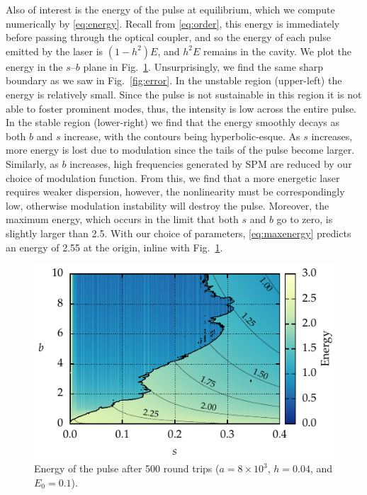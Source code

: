\documentclass[9pt,twocolumn,twoside]{osajnl}
\begin{document}
Also of interest is the energy of the pulse at equilibrium, which we compute numerically by \eqref{eq:energy}. Recall from \eqref{eq:order}, this energy is immediately before passing through the optical coupler, and so the energy of each pulse emitted by the laser is $(1 - h^2) E$, and $h^2 E$ remains in the cavity. We plot the energy in the $s$--$b$ plane in Fig.~\ref{fig:energy}. Unsurprisingly, we find the same sharp boundary as we saw in Fig.~\ref{fig:error}. In the unstable region (upper-left) the energy is relatively small. Since the pulse is not sustainable in this region it is not able to foster prominent modes, thus, the intensity is low across the entire pulse. In the stable region (lower-right) we find that the energy smoothly decays as both $b$ and $s$ increase, with the contours being hyperbolic-esque. As $s$ increases, more energy is lost due to modulation since the tails of the pulse become larger. Similarly, as $b$ increases, high frequencies generated by SPM are reduced by our choice of modulation function. From this, we find that a more energetic laser requires weaker dispersion, however, the nonlinearity must be correspondingly low, otherwise modulation instability will destroy the pulse. Moreover, the maximum energy, which occurs in the limit that both $s$ and $b$ go to zero, is slightly larger than 2.5. With our choice of parameters, \eqref{eq:maxenergy} predicts an energy of 2.55 at the origin, inline with Fig.~\ref{fig:energy}.

\begin{figure}[tbp]
	\centering
	\includegraphics{Figures/ParamSpaceEnergy}
	\caption{Energy of the pulse after 500 round trips ($a = 8 \times 10^3$, $h = 0.04$, and $E_0 = 0.1$).}
	\label{fig:energy}
\end{figure}
\end{document}
